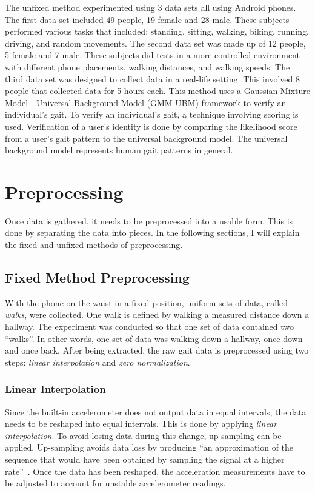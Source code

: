 \documentclass{sig-alternate}
\begin{document}
	The unfixed method experimented using 3 data sets all using Android phones. The first data set included 49 people, 19 female and 28 male. These subjects performed various tasks that included: standing, sitting, walking, biking, running, driving, and random movements. The second data set was made up of 12 people, 5 female and 7 male. These subjects did tests in a more controlled environment with different phone placements, walking distances, and walking speeds. The third data set was designed to collect data in a real-life setting. This involved 8 people that collected data for 5 hours each. This method uses a Gaussian Mixture Model - Universal Background Model (GMM-UBM) framework to verify an individual's gait. To verify an individual's gait, a technique involving scoring is used. Verification of a user's identity is done by comparing the likelihood score from a user's gait pattern to the universal background model. The universal background model represents human gait patterns in general. 


\section{Preprocessing} 
	Once data is gathered, it needs to be preprocessed into a usable form. This is done by separating the data into pieces. In the following sections, I will explain the fixed and unfixed methods of preprocessing.

    
\subsection{Fixed Method Preprocessing}	\label{FPP}
	With the phone on the waist in a fixed position, uniform sets of data, called \textit{walks}, were collected. One walk is defined by walking a measured distance down a hallway. The experiment was conducted so that one set of data contained two ``walks''. In other words, one set of data was walking down a hallway, once down and once back. After being extracted, the raw gait data is preprocessed using two steps: \textit{linear interpolation} and \textit{zero normalization}. 
			
\subsubsection{Linear Interpolation} \label{LI}
	Since the built-in accelerometer does not output data in equal intervals, the data needs to be reshaped into equal intervals. This is done by applying \textit{linear interpolation}. To avoid losing data during this change, up-sampling can be applied. Up-sampling avoids data loss by producing ``an approximation of the sequence that would have been obtained by sampling the signal at a higher rate''~\cite{wiki1:2014}. Once the data has been reshaped, the acceleration measurements have to be adjusted to account for unstable accelerometer readings. 
			
\end{document}
